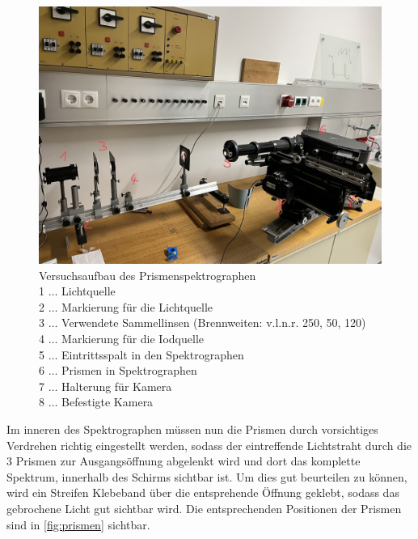 \documentclass[12pt,english,ngerman]{scrartcl}
\begin{document}
\begin{figure}[H]
	\begin{center}
		\includegraphics[width =\textwidth]{./figures/Spektograph.png}
	\end{center}
	\caption[Versuchsaufbau des Prismenspektrographen]
	{Versuchsaufbau des Prismenspektrographen \\
	1 \(\dots\) Lichtquelle \\
	2 \(\dots\) Markierung für die Lichtquelle \\
	3 \(\dots\) Verwendete Sammellinsen (Brennweiten: v.l.n.r. 250, 50, 120) \\
	4 \(\dots\) Markierung für die Iodquelle \\
	5 \(\dots\) Eintrittsspalt in den Spektrographen \\
	6 \(\dots\) Prismen in Spektrographen \\
	7 \(\dots\) Halterung für Kamera \\
	8 \(\dots\) Befestigte Kamera
	}\label{fig:aufbau_Spektograph}
\end{figure}

Im inneren des Spektrographen müssen nun die Prismen durch vorsichtiges Verdrehen richtig eingestellt werden, sodass der 
eintreffende Lichtstraht durch die 3 Prismen zur Ausgangsöffnung abgelenkt wird und dort das komplette Spektrum, innerhalb
des Schirms sichtbar ist. Um dies gut beurteilen zu können, wird ein Streifen Klebeband über die entsprehende Öffnung geklebt,
sodass das gebrochene Licht gut sichtbar wird. Die entsprechenden Positionen der Prismen sind in \autoref{fig:prismen} sichtbar.
\end{document}
